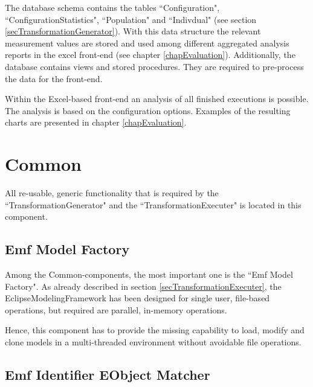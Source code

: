 The database schema contains the tables ``Configuration", ``ConfigurationStatistics", ``Population" and ``Indivdual" (see section \ref{secTransformationGenerator}). With this data structure the relevant measurement values are stored and used among different aggregated analysis reports in the excel front-end (see chapter \ref{chapEvaluation}). Additionally, the database contains views and stored procedures. They are required to pre-process the data for the front-end.

Within the Excel-based front-end an analysis of all finished executions is possible. The analysis is based on the configuration options. Examples of the resulting charts are presented in chapter \ref{chapEvaluation}.




\section{Common}\label{secCommon}

All re-usable, generic functionality that is required by the ``\Gls{TransformationGenerator}" and the ``\Gls{TransformationExecuter}" is located in this component.

\subsection{Emf Model Factory}\label{subsecEmfModelFactory}
Among the Common-components, the most important one is the ``Emf Model Factory". As already described in section \ref{secTransformationExecuter}, the \gls{EclipseModelingFramework} has been designed for single user, file-based operations, but required are parallel, in-memory operations.

Hence, this component has to provide the missing capability to load, modify and clone models in a multi-threaded environment without avoidable file operations.

\subsection{Emf Identifier EObject Matcher}

